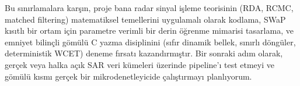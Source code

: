 \documentclass[11pt,a4paper]{article}
\begin{document}
Bu sınırlamalara karşın, proje bana radar sinyal işleme teorisinin (RDA, RCMC, matched filtering) matematiksel temellerini uygulamalı olarak kodlama, SWaP kısıtlı bir ortam için parametre verimli bir derin öğrenme mimarisi tasarlama, ve emniyet bilinçli gömülü C yazma disiplinini (sıfır dinamik bellek, sınırlı döngüler, deterministik WCET) deneme fırsatı kazandırmıştır. Bir sonraki adım olarak, gerçek veya halka açık SAR veri kümeleri üzerinde pipeline'ı test etmeyi ve gömülü kısmı gerçek bir mikrodenetleyicide çalıştırmayı planlıyorum.
\end{document}
